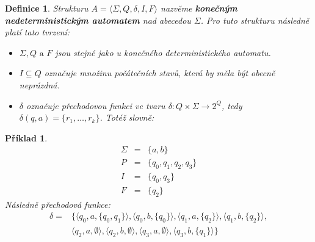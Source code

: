 \documentclass[10pt, a4paper, titlepage]{article}
\theoremstyle{note}
\newtheorem{definice}{Definice}
\newtheorem{priklad}{Příklad}
\begin{document}
\begin{definice}
Strukturu $A = \langle \Sigma, Q, \delta, I, F \rangle$ nazvěme \textbf{konečným nedeterministickým automatem} nad abecedou $\Sigma$. Pro tuto strukturu následně platí tato tvrzení:
\begin{itemize}
\item
$\Sigma, Q \text{ a } F$ jsou stejné jako u konečného deterministického automatu.
\item
$I\subseteq Q$ označuje množinu počátečních stavů, která by měla být obecně neprázdná.
\item
$\delta$ označuje přechodovou funkci ve tvaru $\delta : Q \times \Sigma \rightarrow 2^{Q}$, tedy $\delta (q, a) = \lbrace r_{1}, \ldots, r_{k} \rbrace$. Totéž slovně: 
\end{itemize}
\end{definice}

\begin{priklad}\label{priklad-3}
\begin{eqnarray*}
\Sigma &=& \lbrace a, b \rbrace \\
P &=& \lbrace q_{0}, q_{1}, q_{2}, q_{3} \rbrace \\
I &=& \lbrace q_{0}, q_{3} \rbrace \\
F &=& \lbrace q_{2} \rbrace 
\end{eqnarray*}
Následně přechodová funkce:
\begin{eqnarray*}
\delta =&
\lbrace
\langle q_{0}, a, \lbrace q_{0},q_{1} \rbrace \rangle,
\langle q_{0}, b, \lbrace q_{0} \rbrace \rangle,
\langle q_{1}, a, \lbrace q_{2} \rbrace \rangle,
\langle q_{1}, b, \lbrace q_{2} \rbrace \rangle, \\
& \langle q_{2}, a, \emptyset \rangle,
\langle q_{2}, b, \emptyset \rangle,
\langle q_{3}, a, \emptyset \rangle,
\langle q_{3}, b, \lbrace q_{1} \rbrace \rangle 
\rbrace
\end{eqnarray*}
\end{priklad}
\end{document}
